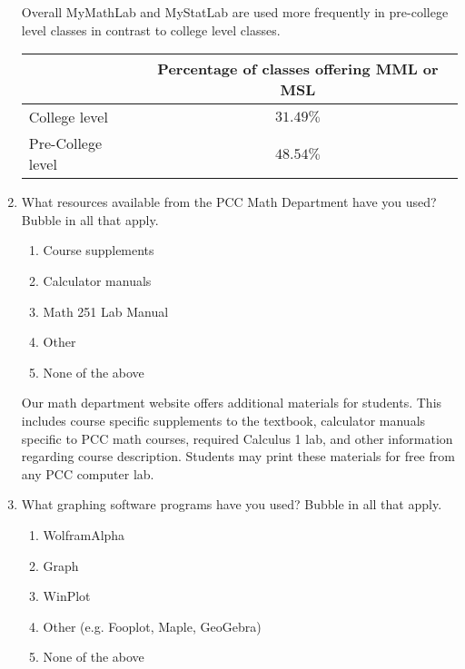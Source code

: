\begin{enumerate}
	Overall MyMathLab and MyStatLab are used more frequently in pre-college level classes in contrast to college level classes. 
	
	\begin{tabular}{lc}
		\toprule
		                  & Percentage of classes offering MML or MSL \\
		\midrule
		College level     & $31.49\%$                                 \\
		Pre-College level & $48.54\%$                                 \\
		\bottomrule
	\end{tabular}
	
	\item What resources available from the PCC Math Department have you used? Bubble in all that apply.
	\begin{enumerate}
		\item  Course supplements
		\item  Calculator manuals
		\item  Math 251 Lab Manual
		\item  Other
		\item  None of the above
	\end{enumerate}
	Our math department website offers additional materials for students. This includes course specific supplements to the textbook, calculator manuals specific to PCC math courses, required Calculus 1 lab, and other information regarding course description. Students may print these materials for free from any PCC computer lab. 
	\item What graphing software programs have you used? Bubble in all that apply.
	\begin{enumerate}
		\item  WolframAlpha
		\item  Graph
		\item  WinPlot
		\item  Other (e.g. Fooplot, Maple, GeoGebra)
		\item  None of the above
	\end{enumerate}
	

\end{enumerate}
